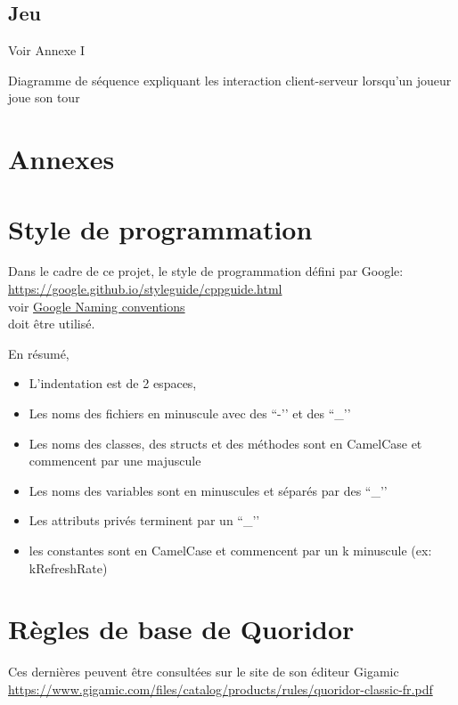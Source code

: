 \documentclass[french, utf8]{article}
\begin{document}
\subsection{Jeu}
Voir Annexe I

Diagramme de séquence expliquant les interaction client-serveur lorsqu'un joueur joue son tour


\newpage
\section{Annexes}
\appendix

\label{sec:Annexes}
\section{Style de programmation}

Dans le cadre de ce projet, le style de programmation défini par Google:
\\ \href{https://google.github.io/styleguide/cppguide.html}{https://google.github.io/styleguide/cppguide.html}
\\ voir \href{https://google.github.io/styleguide/cppguide.html#Naming}{Google Naming conventions}
\\doit être utilisé.

En résumé,
\begin{itemize}
	\item L'indentation est de 2 espaces,
	\item Les noms des fichiers en minuscule avec des ``-’’ et des ``\_’’
	\item Les noms des classes, des structs et des méthodes sont en CamelCase et commencent par une majuscule
	\item Les noms des variables sont en minuscules et séparés par des ``\_’’
	\item Les attributs privés terminent par un ``\_’’
	\item les constantes sont en CamelCase et commencent par un k minuscule (ex: kRefreshRate)
\end{itemize}

\section{Règles de base de Quoridor}
Ces dernières peuvent être consultées sur le site de son éditeur Gigamic \\\href{https://www.gigamic.com/files/catalog/products/rules/quoridor-classic-fr.pdf}{https://www.gigamic.com/files/catalog/products/rules/quoridor-classic-fr.pdf}
\newpage
\end{document}
